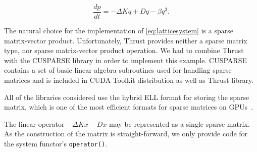 \documentclass[1p]{elsarticle}
\newcommand{\code}[1]{\lstinline|#1|}
\newcommand {\de} {\mbox{d}}
\newcommand {\rem}[1]{}
\begin{document}
\rem{
Another example for our performance and usage study is a strongly
nonlinear disordered Hamiltonian lattice. Its equations of motion are
governed by
\begin{equation}
\frac{\de q_{i,j}}{\de t} = p_{i,j} \quad \text{,} \quad \quad \frac{\de p_{i,j}}{\de t} = - \omega_{i,j}^2 q_i - \beta q_{i,j}^3 + \Delta_d q_{i,j} \,\,\text{.}
\label{eq:disordered_ham}
\end{equation}
Here, $\Delta_d q_{i,j}$ denotes the two-dimensional discreet Laplacian
$\Delta_d
q_{i,j}=q_{i+1,j}+q_{i-1,j}+q_{i,j+1}+q_{i,j-1}-4q_{i,j}$. Such
systems are widely used in theoretical physics to study phenomena
like Anderson localization or thermalization.

An important property of \eqref{eq:disordered_ham} is its Hamiltonian
nature. It can be obtained from a Hamiltonian and the energy and phase
volume is conserved during its evolution. To account for these
properties, a special class of solvers exists, namely symplectic
solvers. Odeint implements three different variants of such solvers,
all are of the Runge-Kutta-Nystrom type.
}

\begin{equation} \label{eq:latticesystem}
    \frac{dp}{dt} = -\Delta Kq + Dq - \beta q^3.
\end{equation}

The natural choice for the implementation of \eqref{eq:latticesystem} is a sparse
matrix-vector product. Unfortunately, Thrust provides neither a sparse matrix
type, nor sparse matrix-vector product operation.  We had to combine Thrust
with the CUSPARSE library in order to implement this example. CUSPARSE
contains a set of basic linear algebra subroutines used for handling sparse
matrices and is included in CUDA Toolkit distribution as well as Thrust
library.

All of the libraries considered use the hybrid
ELL format for storing the sparse matrix, which is one of the most efficient formats for sparse matrices on
GPUs~\cite{BellGarland2008}.

The linear operator $-\Delta Kx-Dx$ may be represented as a single sparse matrix.
As the construction of the matrix is straight-forward, we only provide code for the system functor's \code{operator()}.
\end{document}
